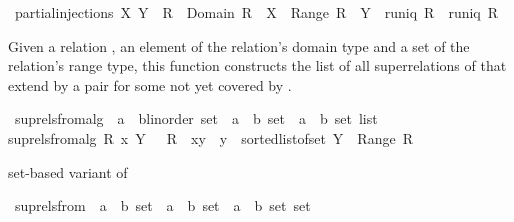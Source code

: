 \begin{isabellebody}
\ {\isachardoublequoteopen}partial{\isacharunderscore}injections\ X\ Y\ {\isacharequal}\ {\isacharbraceleft}R\ {\isachardot}\ Domain\ R\ {\isasymsubseteq}\ X\ {\isasymand}\ Range\ R\ {\isasymsubseteq}\ Y\ {\isasymand}\ runiq\ R\ {\isasymand}\ runiq\ {\isacharparenleft}R{\isasyminverse}{\isacharparenright}{\isacharbraceright}{\isachardoublequoteclose}%
\begin{isamarkuptext}%
Given a relation , an element  of the relation's domain type and
  a set  of the relation's range type, this function constructs the list of all 
  superrelations of  that extend  by a pair  for some
   not yet covered by .%
\end{isamarkuptext}%
\isamarkuptrue%
\isamarkupfalse%
\ sup{\isacharunderscore}rels{\isacharunderscore}from{\isacharunderscore}alg\ {\isacharcolon}{\isacharcolon}\ {\isachardoublequoteopen}{\isacharparenleft}{\isacharprime}a\ {\isasymtimes}\ {\isacharprime}b{\isasymColon}linorder{\isacharparenright}\ set\ {\isasymRightarrow}\ {\isacharprime}a\ {\isasymRightarrow}\ {\isacharprime}b\ set\ {\isasymRightarrow}\ {\isacharparenleft}{\isacharprime}a\ {\isasymtimes}\ {\isacharprime}b{\isacharparenright}\ set\ list{\isachardoublequoteclose}\isanewline
{}\ \isanewline
{\isachardoublequoteopen}sup{\isacharunderscore}rels{\isacharunderscore}from{\isacharunderscore}alg\ R\ x\ Y\ {\isacharequal}\ {\isacharbrackleft}\ R\ {\isacharplus}{\isacharasterisk}\ {\isacharbraceleft}{\isacharparenleft}x{\isacharcomma}y{\isacharparenright}{\isacharbraceright}\ {\isachardot}\ y\ {\isasymleftarrow}\ sorted{\isacharunderscore}list{\isacharunderscore}of{\isacharunderscore}set\ {\isacharparenleft}Y\ {\isacharminus}\ Range\ R{\isacharparenright}\ {\isacharbrackright}{\isachardoublequoteclose}%
\begin{isamarkuptext}%
set-based variant of %
\end{isamarkuptext}%
\isamarkuptrue%
\isamarkupfalse%
\ sup{\isacharunderscore}rels{\isacharunderscore}from\ {\isacharcolon}{\isacharcolon}\ {\isachardoublequoteopen}{\isacharparenleft}{\isacharprime}a\ {\isasymtimes}\ {\isacharprime}b{\isacharparenright}\ set\ {\isasymRightarrow}\ {\isacharprime}a\ {\isasymRightarrow}\ {\isacharprime}b\ set\ {\isasymRightarrow}\ {\isacharparenleft}{\isacharprime}a\ {\isasymtimes}\ {\isacharprime}b{\isacharparenright}\ set\ set{\isachardoublequoteclose}\isanewline

\end{isabellebody}
